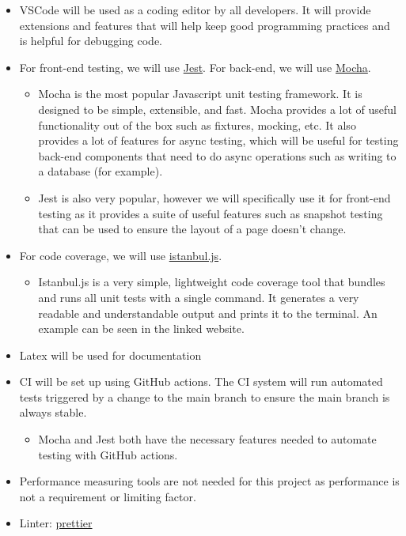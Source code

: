 \documentclass{article}
\begin{document}
\begin{itemize}
\item VSCode will be used as a coding editor by all developers. It will provide extensions and features that will help keep good programming practices and is helpful for debugging code.
\item For front-end testing, we will use \href{https://jestjs.io/}{Jest}. For back-end, we will use \href{https://mochajs.org/}{Mocha}.
\begin{itemize}
    \item Mocha is the most popular Javascript unit testing framework. It is designed to be simple, extensible, and fast. Mocha provides a lot of useful functionality out of the box such as fixtures, mocking, etc. It also provides a lot of features for async testing, which will be useful for testing back-end components that need to do async operations such as writing to a database (for example). 
    
    \item Jest is also very popular, however we will specifically use it for front-end testing as it provides a suite of useful features such as snapshot testing that can be used to ensure the layout of a page doesn't change.
\end{itemize}

\item For code coverage, we will use \href{https://istanbul.js.org/}{istanbul.js}.
\begin{itemize}
    \item Istanbul.js is a very simple, lightweight code coverage tool that bundles and runs all unit tests with a single command. It generates a very readable and understandable output and prints it to the terminal. An example can be seen in the linked website. 
\end{itemize}

\item Latex will be used for documentation
\item CI will be set up using GitHub actions. The CI system will run automated tests triggered by a change to the main branch to ensure the main branch is always stable.
\begin{itemize}
    \item Mocha and Jest both have the necessary features needed to automate testing with GitHub actions.
\end{itemize}

\item Performance measuring tools are not needed for this project as performance is not a requirement or limiting factor.
\item Linter: \href{https://prettier.io/}{prettier}
\end{itemize}
\end{document}
